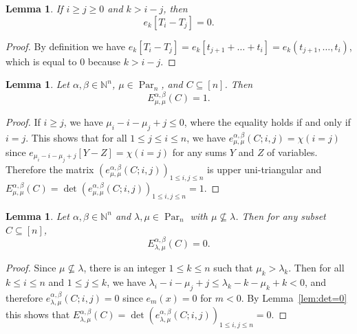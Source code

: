 \documentclass[12pt]{amsart}
\numberwithin{equation}{section}
\newtheorem{lem}[thm]{Lemma}
\theoremstyle{definition}
\newcommand\NN{\mathbb{N}}
\newcommand\Par{\operatorname{Par}}
\begin{document}
\begin{lem}\label{lem:e_k=0}
If $i\ge j\ge0$ and $k>i-j$, then
\[
e_k[T_i-T_j] = 0.
\]
\end{lem}
\begin{proof}
  By definition we have $e_k[T_i-T_j] = e_k[t_{j+1}+\dots+t_i] =
  e_k(t_{j+1},\dots,t_i)$, which is equal to $0$ because $k > i-j$.
\end{proof}


\begin{lem}\label{lem:initial E}
  Let $\alpha,\beta\in\NN^n$, $\mu\in\Par_n$, and $C\subseteq[n]$. Then
\[
  E^{\alpha,\beta}_{\mu,\mu}(C) = 1.
\]
\end{lem}
\begin{proof}
  If $i\ge j$, we have $\mu_i-i-\mu_j+j\le 0$, where the equality holds if and
  only if $i=j$. This shows that for all $1\le j\le i\le n$, we have
  $e^{\alpha,\beta}_{\mu,\mu}(C;i,j)= \chi(i=j)$ since
  $e_{\mu_i-i-\mu_j+j}[Y-Z]=\chi(i=j)$ for any sums $Y$ and $Z$ of variables.
  Therefore the matrix $(e^{\alpha,\beta}_{\mu,\mu}(C;i,j))_{1\le i,j\le n}$ is
  upper uni-triangular and $E^{\alpha,\beta}_{\mu,\mu}(C) =
  \det(e^{\alpha,\beta}_{\mu,\mu}(C;i,j))_{1\le i,j\le n}=1$.
\end{proof}


\begin{lem}\label{lem:E(C)=0}
  Let $\alpha,\beta\in\NN^n$ and $\lambda,\mu\in\Par_n$ with
  $\mu\not\subseteq\lambda$. Then for any subset $C\subseteq[n]$,
\[
  E^{\alpha,\beta}_{\lambda,\mu}(C) = 0.
\]
\end{lem}
\begin{proof}
  Since $\mu\not\subseteq\lambda$, there is an integer $1\le k\le n$ such that
  $\mu_k>\lambda_k$. Then for all $k\le i\le n$ and $1\le j\le k$, we have
  $\lambda_i-i-\mu_j+j\le \lambda_k-k-\mu_k+k<0$, and therefore
  $e^{\alpha,\beta}_{\lambda,\mu}(C;i,j)=0$ since $e_{m}(x)=0$ for $m<0$. By
  Lemma~\ref{lem:det=0} this shows that $E^{\alpha,\beta}_{\lambda,\mu}(C) =
  \det(e^{\alpha,\beta}_{\lambda,\mu}(C;i,j))_{1\le i,j\le n}=0$.
\end{proof}
\end{document}
